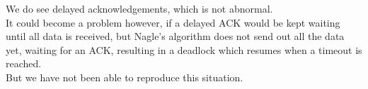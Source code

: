We do see delayed acknowledgements, which is not abnormal.\\
It could become a problem however, if a delayed ACK would be kept waiting until all data is received, but Nagle's algorithm does not send out all the data yet, waiting for an ACK, resulting in a deadlock which resumes when a timeout is reached.\\
But we have not been able to reproduce this situation.